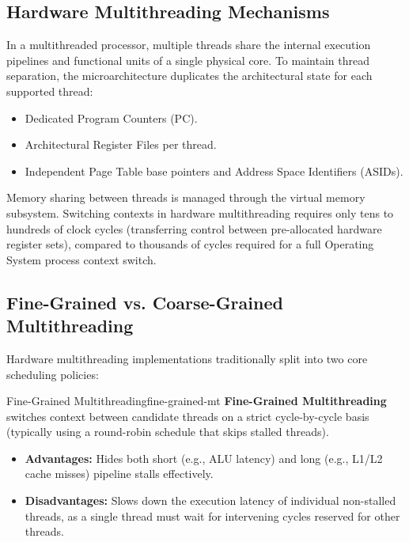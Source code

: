 \subsection{Hardware Multithreading Mechanisms}

In a multithreaded processor, multiple threads share the internal execution pipelines and functional units of a single physical core. To maintain thread separation, the microarchitecture duplicates the architectural state for each supported thread:
\begin{itemize}
    \item Dedicated Program Counters (PC).
    \item Architectural Register Files per thread.
    \item Independent Page Table base pointers and Address Space Identifiers (ASIDs).
\end{itemize}

Memory sharing between threads is managed through the virtual memory subsystem. Switching contexts in hardware multithreading requires only tens to hundreds of clock cycles (transferring control between pre-allocated hardware register sets), compared to thousands of cycles required for a full Operating System process context switch.

\subsection{Fine-Grained vs. Coarse-Grained Multithreading}

Hardware multithreading implementations traditionally split into two core scheduling policies:

\begin{definition}{Fine-Grained Multithreading}{fine-grained-mt}
    \textbf{Fine-Grained Multithreading} switches context between candidate threads on a strict cycle-by-cycle basis (typically using a round-robin schedule that skips stalled threads).
    \begin{itemize}
        \item \textbf{Advantages:} Hides both short (e.g., ALU latency) and long (e.g., L1/L2 cache misses) pipeline stalls effectively.
        \item \textbf{Disadvantages:} Slows down the execution latency of individual non-stalled threads, as a single thread must wait for intervening cycles reserved for other threads.
    \end{itemize}
\end{definition}

